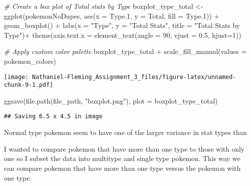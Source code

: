 \documentclass[
]{article}
\newenvironment{Shaded}{\begin{snugshade}}{\end{snugshade}}
\newcommand{\AttributeTok}[1]{\textcolor[rgb]{0.77,0.63,0.00}{#1}}
\newcommand{\CommentTok}[1]{\textcolor[rgb]{0.56,0.35,0.01}{\textit{#1}}}
\newcommand{\DecValTok}[1]{\textcolor[rgb]{0.00,0.00,0.81}{#1}}
\newcommand{\FloatTok}[1]{\textcolor[rgb]{0.00,0.00,0.81}{#1}}
\newcommand{\FunctionTok}[1]{\textcolor[rgb]{0.00,0.00,0.00}{#1}}
\newcommand{\NormalTok}[1]{#1}
\newcommand{\OtherTok}[1]{\textcolor[rgb]{0.56,0.35,0.01}{#1}}
\newcommand{\SpecialCharTok}[1]{\textcolor[rgb]{0.00,0.00,0.00}{#1}}
\newcommand{\StringTok}[1]{\textcolor[rgb]{0.31,0.60,0.02}{#1}}
\begin{document}
\begin{Shaded}
\begin{Highlighting}[]
\CommentTok{\# Create a box plot of Total stats by Type}
\NormalTok{boxplot\_type\_total }\OtherTok{\textless{}{-}} \FunctionTok{ggplot}\NormalTok{(pokemonNoDupes, }\FunctionTok{aes}\NormalTok{(}\AttributeTok{x =}\NormalTok{ Type}\FloatTok{.1}\NormalTok{, }\AttributeTok{y =}\NormalTok{ Total, }\AttributeTok{fill =}\NormalTok{ Type}\FloatTok{.1}\NormalTok{)) }\SpecialCharTok{+}
  \FunctionTok{geom\_boxplot}\NormalTok{() }\SpecialCharTok{+}
  \FunctionTok{labs}\NormalTok{(}\AttributeTok{x =} \StringTok{"Type"}\NormalTok{, }\AttributeTok{y =} \StringTok{"Total Stats"}\NormalTok{, }\AttributeTok{title =} \StringTok{"Total Stats by Type"}\NormalTok{)}\SpecialCharTok{+}
  \FunctionTok{theme}\NormalTok{(}\AttributeTok{axis.text.x =} \FunctionTok{element\_text}\NormalTok{(}\AttributeTok{angle =} \DecValTok{90}\NormalTok{, }\AttributeTok{vjust =} \FloatTok{0.5}\NormalTok{, }\AttributeTok{hjust=}\DecValTok{1}\NormalTok{))}

\CommentTok{\# Apply custom color palette}
\NormalTok{boxplot\_type\_total }\SpecialCharTok{+} \FunctionTok{scale\_fill\_manual}\NormalTok{(}\AttributeTok{values =}\NormalTok{ pokemon\_colors)}
\end{Highlighting}
\end{Shaded}

\texttt{[image: Nathaniel-Fleming\_Assignment\_3\_files/figure-latex/unnamed-chunk-9-1.pdf]}

\begin{Shaded}
\begin{Highlighting}[]
\FunctionTok{ggsave}\NormalTok{(}\FunctionTok{file.path}\NormalTok{(file\_path, }\StringTok{"boxplot.png"}\NormalTok{), }\AttributeTok{plot =}\NormalTok{ boxplot\_type\_total)}
\end{Highlighting}
\end{Shaded}

\begin{verbatim}
## Saving 6.5 x 4.5 in image
\end{verbatim}

Normal type pokemon seem to have one of the larger variance in stat
types than

I wanted to compare pokemon that have more than one type to those with
only one so I subset the data into multitype and single type pokemon.
This way we can compare pokemon that have more than one type versus the
pokemon with one type.

\begin{Shaded}
\end{Shaded}
\end{document}
